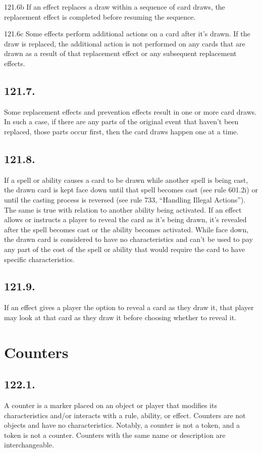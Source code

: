 121.6b If an effect replaces a draw within a sequence of card draws, the replacement effect is completed before resuming the sequence.

121.6c Some effects perform additional actions on a card after it’s drawn. If the draw is replaced, the additional action is not performed on any cards that are drawn as a result of that replacement effect or any subsequent replacement effects.

\subsection*{121.7.}
Some replacement effects and prevention effects result in one or more card draws. In such a case, if there are any parts of the original event that haven’t been replaced, those parts occur first, then the card draws happen one at a time.

\subsection*{121.8.}
If a spell or ability causes a card to be drawn while another spell is being cast, the drawn card is kept face down until that spell becomes cast (see rule 601.2i) or until the casting process is reversed (see rule 733, “Handling Illegal Actions”). The same is true with relation to another ability being activated. If an effect allows or instructs a player to reveal the card as it’s being drawn, it’s revealed after the spell becomes cast or the ability becomes activated. While face down, the drawn card is considered to have no characteristics and can’t be used to pay any part of the cost of the spell or ability that would require the card to have specific characteristics.

\subsection*{121.9.}
If an effect gives a player the option to reveal a card as they draw it, that player may look at that card as they draw it before choosing whether to reveal it.

\section{Counters}
\subsection*{122.1.}
A counter is a marker placed on an object or player that modifies its characteristics and/or interacts with a rule, ability, or effect. Counters are not objects and have no characteristics. Notably, a counter is not a token, and a token is not a counter. Counters with the same name or description are interchangeable.

